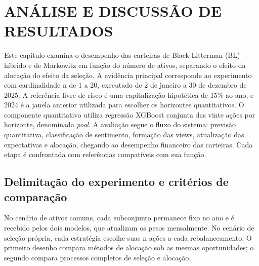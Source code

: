 \chapter{ANÁLISE E DISCUSSÃO DE RESULTADOS}
\label{cap:resultados}
\renewcommand{\thetable}{\thechapter.\arabic{table}}
\renewcommand{\thefigure}{\thechapter.\arabic{figure}}
\setcounter{table}{0}\setcounter{figure}{0}
Este capítulo examina o desempenho das carteiras de Black-Litterman (BL) híbrido e de Markowitz em função do número de ativos, separando o efeito da alocação do efeito da seleção. A evidência principal corresponde ao experimento com cardinalidade n de 1 a 20, executado de 2 de janeiro a 30 de dezembro de 2025. A referência livre de risco é uma capitalização hipotética de 15\% ao ano, e 2024 é a janela anterior utilizada para escolher os horizontes quantitativos. O componente quantitativo utiliza regressão XGBoost conjunta das vinte ações por horizonte, denominada \emph{pool}. A avaliação segue o fluxo do sistema: previsão quantitativa, classificação de sentimento, formação das views, atualização das expectativas e alocação, chegando ao desempenho financeiro das carteiras. Cada etapa é confrontada com referências compatíveis com sua função.

\section{Delimitação do experimento e critérios de comparação}
No cenário de ativos comuns, cada subconjunto permanece fixo no ano e é recebido pelos dois modelos, que atualizam os pesos mensalmente. No cenário de seleção própria, cada estratégia escolhe suas n ações a cada rebalanceamento. O primeiro desenho compara métodos de alocação sob as mesmas oportunidades; o segundo compara processos completos de seleção e alocação.

